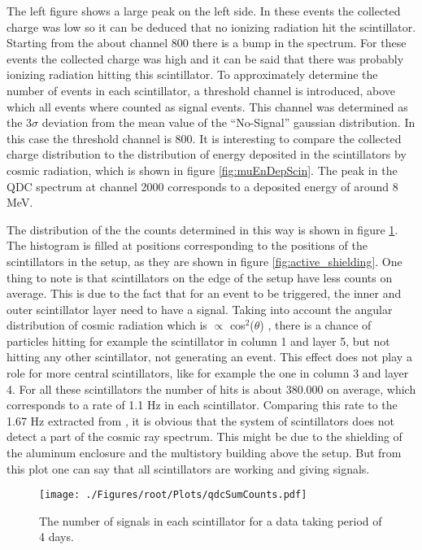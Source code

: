 The left figure shows a large peak on the left side. In these events the collected charge was low so it can be deduced that no ionizing radiation hit the scintillator. Starting from the about channel 800 there is a bump in the spectrum. For these events the collected charge was high and it can be said that there was probably ionizing radiation hitting this scintillator. To approximately determine the number of events in each scintillator, a threshold channel is introduced, above which all events where counted as signal events. This channel was determined as the 3$\sigma$ deviation from the mean value of the ``No-Signal'' gaussian distribution. In this case the threshold channel is 800. It is interesting to compare the collected charge distribution to the distribution of energy deposited in the scintillators by cosmic radiation, which is shown in figure \ref{fig:muEnDepScin}. The peak in the QDC spectrum at channel 2000 corresponds to a deposited energy of around 8 MeV. 

The distribution of the the counts determined in this way is shown in figure \ref{fig:qdcCounts}. The histogram is filled at positions corresponding to the positions of the scintillators in the setup, as they are shown in figure \ref{fig:active_shielding}. One thing to note is that scintillators on the edge of the setup have less counts on average. This is due to the fact that for an event to be triggered, the inner and outer scintillator layer need to have a signal. Taking into account the angular distribution of cosmic radiation which is $\propto$ cos$^{2}$($\theta$) \cite{Gaisser2000}, there is a chance of particles hitting for example the scintillator in column 1 and layer 5, but not hitting any other scintillator, not generating an event. This effect does not play a role for more central scintillators, like for example the one in column 3 and layer 4. For all these scintillators the number of hits is about 380.000 on average, which corresponds to a rate of 1.1 Hz in each scintillator. Comparing this rate to the 1.67 Hz extracted from \cite{Gaisser2000}, it is obvious that the system of scintillators does not detect a part of the cosmic ray spectrum. This might be due to the shielding of the aluminum enclosure and the multistory building above the setup. But from this plot one can say that all scintillators are working and giving signals.

\begin{figure}[h]
 \centering
 \texttt{[image: ./Figures/root/Plots/qdcSumCounts.pdf]}
 \caption{The number of signals in each scintillator for a data taking period of 4 days.}
 \label{fig:qdcCounts}
\end{figure}

